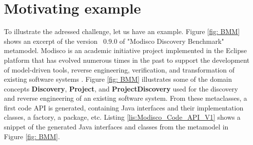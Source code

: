 \section{Motivating example}
\label{example}


To illustrate the adressed challenge, let us have an example. 
Figure \ref{fig: BMM} shows an excerpt of the  version ~0.9.0 of "Modisco Discovery Benchmark" metamodel. %
Modisco is an academic initiative project implemented in the Eclipse platform that has evolved numerous times in the past to support the development of model-driven tools, reverse engineering, verification, and transformation of existing software systems \cite{bruneliere2010modisco,bruneliere2014modisco}.
Figure \ref{fig: BMM} illustrates  some of the domain concepts \textbf{Discovery}, \textbf{Project}, and \textbf{ProjectDiscovery}  used for the discovery and reverse engineering of an existing software system. 
From these metaclasses, a first code API is generated, containing Java interfaces and their implementation classes, a factory, a package, etc. %
Listing \ref{lis:Modisco_Code_API_V1} shows a snippet of the generated Java interfaces and classes from the metamodel in Figure \ref{fig: BMM}. 

